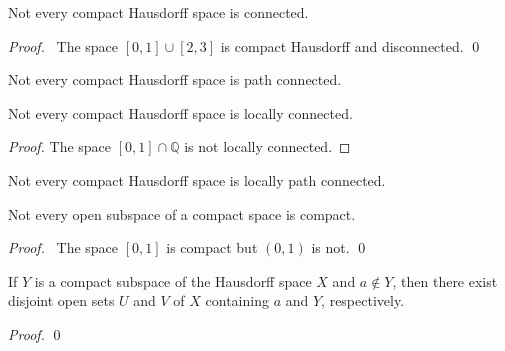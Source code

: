 \begin{cor}
Not every compact Hausdorff space is connected.
\end{cor}

\begin{proof}
\pf\ The space $[0,1] \cup [2,3]$ is compact Hausdorff and disconnected. \qed
\end{proof}

\begin{cor}
Not every compact Hausdorff space is path connected.
\end{cor}

\begin{cor}
Not every compact Hausdorff space is locally connected.
\end{cor}

\begin{proof}
The space $[0,1] \cap \mathbb{Q}$ is not locally connected.
\end{proof}

\begin{cor}
Not every compact Hausdorff space is locally path connected.
\end{cor}

\begin{prop}
Not every open subspace of a compact space is compact.
\end{prop}

\begin{proof}
\pf\ The space $[0,1]$ is compact but $(0,1)$ is not. \qed
\end{proof}

\begin{lm}
  \label{lm:topology:compact:regular}
  If $Y$ is a compact subspace of the Hausdorff space $X$ and $a \notin Y$,
  then there exist disjoint open sets $U$ and $V$ of $X$ containing $a$ and
  $Y$,
  respectively.
\end{lm}

\begin{proof}
  \pf
  \qed
\end{proof}

